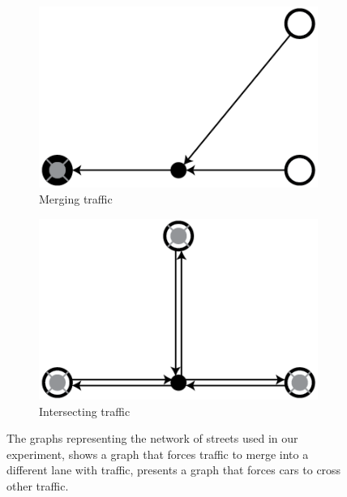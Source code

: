 \begin{figure}
	\centering
	\begin{subfigure}{0.45\textwidth}
		\centering
		\includegraphics[width=\textwidth]{./img/method_experiment_merging}
		\caption{Merging traffic}
		\label{fig:method:experiment:merging}
	\end{subfigure}
	\begin{subfigure}{0.45\textwidth}
		\centering
		\includegraphics[width=\textwidth]{./img/method_experiment_intersection}
		\caption{Intersecting traffic}
		\label{fig:method:experiment:intersection}
	\end{subfigure}	
	\caption{The graphs representing the network of streets used in our experiment,  shows a graph that forces traffic to merge into a different lane with traffic,  presents a graph that forces cars to cross other traffic.}
	\label{fig:method:experimentGraphs}
\end{figure}

